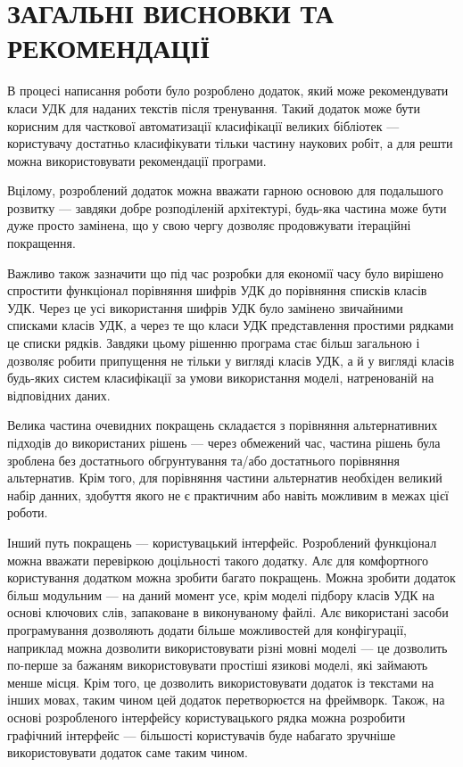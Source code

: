 \documentclass[14pt]{extarticle}
\let\oldsection\section
\renewcommand{\section}{\clearpage\oldsection}
\newcommand{\unnumberedSection}[1]{%
  \section*{#1}%
  \phantomsection
  \addcontentsline{toc}{section}{#1}%
}
\begin{document}
  \unnumberedSection{ЗАГАЛЬНІ ВИСНОВКИ ТА РЕКОМЕНДАЦІЇ}

  В процесі написання роботи було розроблено додаток,
  який може рекомендувати класи УДК для наданих текстів після тренування.
  Такий додаток може бути корисним для часткової автоматизації
  класифікації великих бібліотек ---
  користувачу достатньо класифікувати тільки частину наукових робіт,
  а для решти можна використовувати рекомендації програми.

  Вцілому, розроблений додаток можна вважати гарною
  основою для подальшого розвитку --- завдяки добре розподіленій архітектурі,
  будь-яка частина може бути дуже просто замінена,
  що у свою чергу дозволяє продовжувати ітераційні покращення.

  Важливо також зазначити що під час розробки для економії часу було вирішено
  спростити функціонал порівняння шифрів УДК до порівняння списків класів УДК.
  Через це усі використання шифрів УДК було замінено звичайними
  списками класів УДК, а через те що класи УДК представлення простими рядками
  це списки рядків.
  Завдяки цьому рішенню програма стає більш загальною і дозволяє робити
  припущення не тільки у вигляді класів УДК, а й у вигляді класів
  будь-яких систем класифікації за умови використання моделі,
  натренованій на відповідних даних.

  Велика частина очевидних покращень складаєтся з порівняння альтернативних
  підходів до використаних рішень --- через обмежений час,
  частина рішень була зроблена без достатнього обгрунтування та/або
  достатнього порівняння альтернатив. Крім того,
  для порівняння частини альтернатив необхіден великий набір данних,
  здобуття якого не є практичним або навіть можливим в межах цієї роботи.

  Інший путь покращень --- користувацький інтерфейс.
  Розроблений функціонал можна вважати перевіркою доцільності такого додатку.
  Алє для комфортного користування додатком можна зробити багато покращень.
  Можна зробити додаток більш модульним --- на даний момент усе,
  крім моделі підбору класів УДК на основі ключових слів,
  запаковане в виконуваному файлі.
  Алє використані засоби програмування дозволяють додати більше можливостей
  для конфігурації, наприклад можна дозволити використовувати різні мовні моделі
  --- це дозволить по-перше за бажаням використовувати простіші язикові моделі,
  які займають менше місця. Крім того,
  це дозволить використовувати додаток із текстами на інших мовах,
  таким чином цей додаток перетворюєтся на фреймворк.
  Також, на основі розробленого інтерфейсу користувацького рядка
  можна розробити графічний інтерфейс ---
  більшості користувачів буде набагато зручніше використовувати додаток
  саме таким чином.
\end{document}
